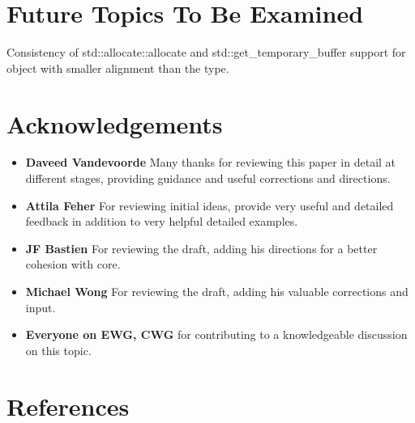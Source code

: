 \documentclass[11pt]{article}
\begin{document}
\section{Future Topics To Be Examined}

Consistency of std::allocate::allocate and std::get\_temporary\_buffer support for object with smaller alignment than the type.



\section{Acknowledgements}

\begin{itemize}
    \item \textbf{Daveed Vandevoorde} Many thanks for reviewing this paper in detail at different stages, providing guidance and useful corrections and directions. 
    \item \textbf{Attila Feher} For reviewing initial ideas, provide very useful and detailed feedback in addition to very helpful detailed examples.
    \item \textbf{JF Bastien} For reviewing the draft, adding his directions for a better cohesion with core.
    \item \textbf{Michael Wong} For reviewing the draft, adding his valuable corrections and input. 
    \\
    \item \textbf{Everyone on EWG, CWG} for contributing to a knowledgeable discussion on this topic.
    \end{itemize}



\newpage



\section{References}

\renewcommand{\section}[5]{}
\end{document}
